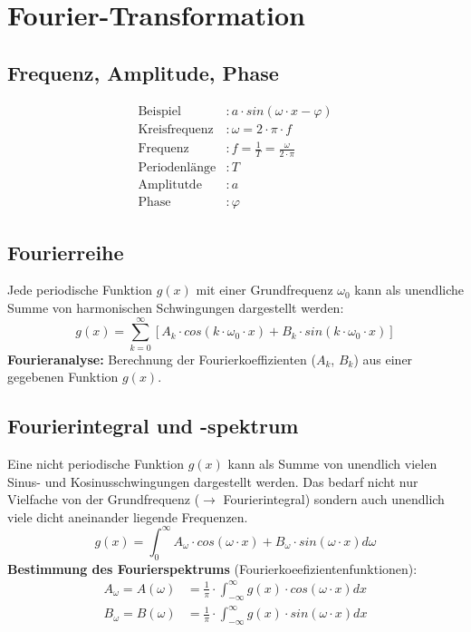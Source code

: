 \documentclass[10pt]{article}
\begin{document}
\pagebreak
\section{Fourier-Transformation}

\subsection{Frequenz, Amplitude, Phase}
\begin{align*}
	\text{Beispiel} &: a \cdot sin(\omega \cdot x - \varphi) \\
	\text{Kreisfrequenz} &: \omega = 2 \cdot \pi \cdot f \\
	\text{Frequenz} &: f = \frac{1}{T} = \frac{\omega}{2 \cdot \pi} \\
	\text{Periodenlänge} &: T \\
	\text{Amplitutde} &: a \\
	\text{Phase} &: \varphi 
\end{align*}

\subsection{Fourierreihe}
Jede periodische Funktion $g(x)$ mit einer Grundfrequenz $\omega_0$ kann als unendliche Summe von harmonischen Schwingungen dargestellt werden:
\begin{equation*}
	g(x) = \sum_{k=0}^\infty \left[ A_k \cdot cos(k \cdot \omega_0 \cdot x) + B_k \cdot sin(k \cdot \omega_0 \cdot x) \right]
\end{equation*}
\textbf{Fourieranalyse:} Berechnung der Fourierkoeffizienten ($A_k$, $B_k$) aus einer gegebenen Funktion $g(x)$.

\subsection{Fourierintegral und -spektrum}
Eine nicht periodische Funktion $g(x)$ kann als Summe von unendlich vielen Sinus- und Kosinusschwingungen dargestellt werden. Das bedarf nicht nur Vielfache von der Grundfrequenz ($\rightarrow$ Fourierintegral) sondern auch unendlich viele dicht aneinander liegende Frequenzen.
\begin{equation*}
	g(x) = \int_0^\infty A_\omega \cdot cos(\omega \cdot x) + B_\omega \cdot sin(\omega \cdot x) d\omega
\end{equation*}
\textbf{Bestimmung des Fourierspektrums} (Fourierkoeefizientenfunktionen):
\begin{align*}
	A_\omega = A(\omega) &= \frac{1}{\pi} \cdot \int_{-\infty}^\infty g(x) \cdot cos(\omega \cdot x) dx \\
	B_\omega = B(\omega) &= \frac{1}{\pi} \cdot \int_{-\infty}^\infty g(x) \cdot sin(\omega \cdot x) dx \\
\end{align*}
\end{document}

